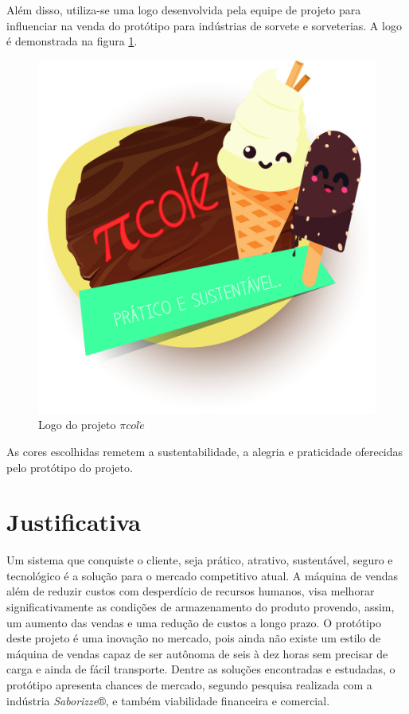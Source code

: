 Além disso, utiliza-se uma logo desenvolvida pela equipe de projeto para influenciar na venda do protótipo para indústrias de sorvete e sorveterias. A logo é demonstrada na figura \ref{fig:logopicole}.

\begin{figure}[H]
	\centering
    \includegraphics[scale=0.2]{figuras/logo_picole}
    \caption{Logo do projeto $\pi col\acute{e}$}
    \label{fig:logopicole}
\end{figure}

As cores escolhidas remetem a sustentabilidade, a alegria e praticidade oferecidas pelo protótipo do projeto.

\section{Justificativa}

Um sistema que conquiste o cliente, seja prático, atrativo, sustentável, seguro e tecnológico é a solução para o mercado competitivo atual.
A máquina de vendas além de reduzir custos com desperdício de recursos humanos, visa melhorar significativamente as condições de armazenamento do produto provendo, assim, um aumento das vendas e uma redução de custos a longo prazo.
O protótipo deste projeto é uma inovação no mercado, pois ainda não existe um estilo de máquina de vendas capaz de ser autônoma de seis à dez horas sem precisar de carga e ainda de fácil transporte.
Dentre as soluções encontradas e estudadas, o protótipo apresenta chances de mercado, segundo pesquisa realizada com a indústria \textit{Saborizze}®, e também viabilidade financeira e comercial.

